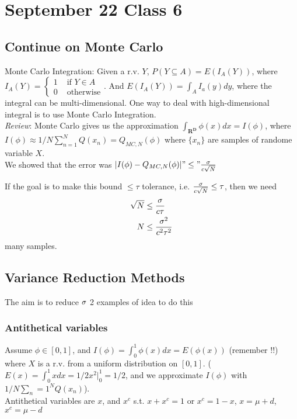 \pagebreak
\section{September 22 Class 6}
\label{sec:class6}

\subsection{Continue on Monte Carlo}
\label{sec:montecarlo2}
Monte Carlo Integration: Given a r.v. $Y$, $P(Y\subseteq
A)=E(I_A(Y))$, where $I_A(Y) =
\begin{cases}
 1 & \text{ if } Y\in A\\
 0 & \text{ otherwise} 
\end{cases}
$. 
And $E(I_A(Y)) = \int_AI_a(y)dy$, where the integral can be
multi-dimensional. One way to deal with high-dimensional integral is
to use Monte Carlo Integration.\\

\noi
\emph{Review}: Monte Carlo gives us the approximation $\int_{\mathbf{R^D}}\phi(x)dx =
I(\phi)$, where $I(\phi) \approx 1/N\sum_{n=1}^NQ(x_n) = Q_{MC,N}(\phi)$ where $\{x_n\}$
are samples of randome variable $X$.
\\
We showed that the error was $|I(\phi) - Q_{MC,N}(\phi)|"\le"
\frac{\sigma}{c\sqrt{N}}$

\noi
If the goal is to make this bound $\le \tau$ tolerance,
i.e. $\frac{\sigma}{c\sqrt{N}} \le \tau$, then we need 
\begin{align*}
\sqrt{N} &\le \frac{\sigma}{c\tau}\\
N &\le  \frac{\sigma^2}{c^2\tau^2}  
\end{align*}
many samples.
\subsection{Variance Reduction Methods}
\label{sec:variancereduction}
The aim is to reduce $\sigma$
2 examples of idea to do this

\subsubsection{Antithetical variables}
Assume $\phi \in [0,1]$, and $I(\phi)
  =\int_0^1\phi(x)dx = E(\phi(x))$ (remember !!) where $X$ is a r.v. from a uniform
  distribution on $[0,1]$. ($E(x) = \int_0^1xdx = 1/2x^2|_0^1 = 1/2$,
  and we approximate $I(\phi)$ with
  $1/N\sum_n=1^NQ(x_n)$).\\ Antithetical variables are $x$, and $x^c$
  s.t. $x+x^c = 1$ or  $x^c= 1-x$, $x = \mu + d$, $x^c = \mu - d$

